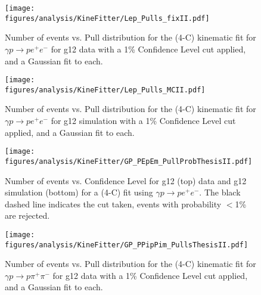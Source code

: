 

\begin{figure}[h!]\begin{center}
\texttt{[image: \\figures/analysis/KineFitter/Lep\_Pulls\_fixII.pdf]}
\caption[Number of events vs. Pull distribution for the (4-C) kinematic fit for $\gamma p \rightarrow p e^+ e^-$ for g12 data with a 1\% Confidence Level cut applied, and a Gaussian fit to each]{\label{fig:kinfit.LepPullData}Number of events vs. Pull distribution for the (4-C) kinematic fit for $\gamma p \rightarrow p e^+ e^-$ for g12 data with a 1\% Confidence Level cut applied, and a Gaussian fit to each.}
\end{center}\end{figure}
%
%
\begin{figure}[h!]\begin{center}
\texttt{[image: \\figures/analysis/KineFitter/Lep\_Pulls\_MCII.pdf]}
\caption[Number of events vs. Pull distribution for the (4-C) kinematic fit for $\gamma p \rightarrow p e^+ e^-$ for g12 simulation with a 1\% Confidence Level cut applied, and a Gaussian fit to each]{\label{fig:kinfit.LepPullMC}Number of events vs. Pull distribution for the (4-C) kinematic fit for $\gamma p \rightarrow p e^+ e^-$ for g12 simulation with a 1\% Confidence Level cut applied, and a Gaussian fit to each.}
\end{center}\end{figure}
%
%
\begin{figure}[h!]\begin{center}
\texttt{[image: \\figures/analysis/KineFitter/GP\_PEpEm\_PullProbThesisII.pdf]}
\caption[Number of events vs. Confidence Level for g12 (top) data and g12 simulation (bottom) for a (4-C) fit using $\gamma p \rightarrow p e^+ e^-$]{\label{fig:kinfit.LepPullProb}Number of events vs. Confidence Level for g12 (top) data and g12 simulation (bottom) for a (4-C) fit using $\gamma p \rightarrow p e^+ e^-$. The black dashed line indicates the cut taken, events with probability $<$1\% are rejected.}
\end{center}\end{figure}
%
\begin{figure}[h!]\begin{center}
\texttt{[image: \\figures/analysis/KineFitter/GP\_PPipPim\_PullsThesisII.pdf]}
\caption[Number of events vs. Pull distribution for the (4-C) kinematic fit for $\gamma p \rightarrow p \pi^+ \pi^-$ for g12 data with a 1\% Confidence Level cut applied, and a Gaussian fit to each]{\label{fig:kinfit.PiPullData}Number of events vs. Pull distribution for the (4-C) kinematic fit for $\gamma p \rightarrow p \pi^+ \pi^-$ for g12 data with a 1\% Confidence Level cut applied, and a Gaussian fit to each.}
\end{center}\end{figure}
